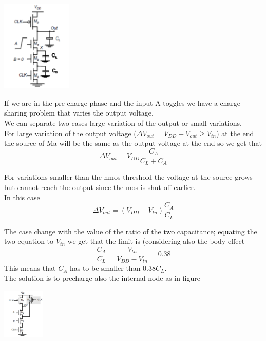 \centering
\includegraphics[width=0.25\textwidth]{C9_4.png}\\
\raggedright

If we are in the pre-charge phase and the input A toggles we have a charge sharing problem that varies the output voltage.\\
We can separate two cases large variation of the output or small variations.\\
\vspace{3mm}
For large variation of the output voltage ($\Delta V_{out}=V_{DD}-V_{out}\ge V_{tn} $) at the end the source of Ma will be the same as the output voltage at the end so we get that 
\begin{equation}
\Delta V_{out}=V_{DD}\frac{C_A}{C_L+C_A}
\end{equation}

\vspace{3mm}
For variations smaller than the nmos threshold the voltage at the source grows but cannot reach the output since the mos is shut off earlier.\\
In this case 
\begin{equation}
\Delta V_{out}=(V_{DD}-V_{tn})\frac{C_A}{C_L}
\end{equation}

\vspace{3mm}
The case change with the value of the ratio of the two capacitance; equating  the two equation to $V_{tn}$ we get that the limit is (considering also the body effect
\begin{equation}
\frac{C_A}{C_L}=\frac{V_{tn}}{V_{DD}-V_{tn}} = 0.38
\end{equation}
This means that $C_A$ has to be smaller than 0.38$C_L$.\\


\vspace{5mm}
The solution is to precharge also the internal node as in figure

\centering
\includegraphics[width=0.15\textwidth]{C9_5.png}\\
\raggedright

